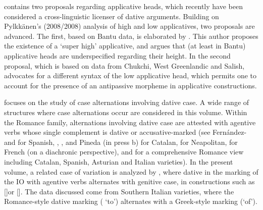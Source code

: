 \begin{styleListNumberi}
contains two proposals regarding applicative heads, which recently have been considered a cross-linguistic licenser of dative arguments. Building on Pylkkänen’s (2008/2008) analysis of high and low applicatives, two proposals are advanced. The first, based on Bantu data, is elaborated by . This author proposes the existence of a ‘super high’ applicative, and argues that (at least in Bantu) applicative heads are underspecified regarding their height. In the second proposal, which is based on data from Chukchi, West Greenlandic and Salish, advocates for a different syntax of the low applicative head, which permits one to account for the presence of an antipassive morpheme in applicative constructions. 
\end{styleListNumberi}

\begin{styleListNumberi}
 focuses on the study of case alternations involving dative case. A wide range of structures where case alternations occur are considered in this volume. Within the Romance family, alternations involving dative case are attested with agentive verbs whose single complement is dative or accusative-marked (see Fernández-\citet{Ordóñez1999} and \citet{Sáez2009} for Spanish, \citet{Ramos2005}, \citet{Morant2008}, \citet{PinedaRoyo2017} and Pineda (in press b) for Catalan, \citet{Ledgeway2000} for Neapolitan, \citet{Troberg2008} for French (on a diachronic perspective), and \citet{Pineda2016} for a comprehensive Romance view including Catalan, Spanish, Asturian and Italian varieties). In the present volume, a related case of variation is analyzed by , where dative in the marking of the IO with agentive verbs alternates with genitive case, in constructions such as []or []. The data discussed come from Southern Italian varieties, where the Romance-style dative marking ( ‘to’) alternates with a Greek-style marking (‘of’). 
\end{styleListNumberi}


